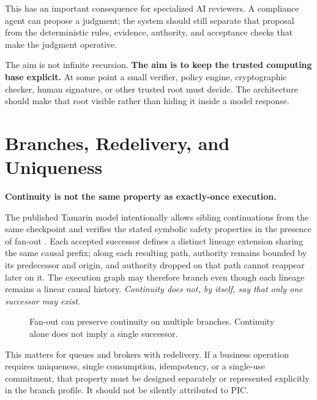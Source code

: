 \documentclass[10pt,oneside,openany]{book}
\begin{document}
This has an important consequence for specialized AI reviewers. A compliance agent can propose a judgment; the system should still separate that proposal from the deterministic rules, evidence, authority, and acceptance checks that make the judgment operative.

The aim is not infinite recursion. \textbf{The aim is to keep the trusted computing base explicit.} At some point a small verifier, policy engine, cryptographic checker, human signature, or other trusted root must decide. The architecture should make that root visible rather than hiding it inside a model response.


\chapter{Branches, Redelivery, and Uniqueness}

\textbf{Continuity is not the same property as exactly-once execution.}

The published Tamarin model intentionally allows sibling continuations from the same checkpoint and verifies the stated symbolic safety properties in the presence of fan-out \cite{pictamarin}. Each accepted successor defines a distinct lineage extension sharing the same causal prefix; along each resulting path, authority remains bounded by its predecessor and origin, and authority dropped on that path cannot reappear later on it. The execution graph may therefore branch even though each lineage remains a linear causal history. \emph{Continuity does not, by itself, say that only one successor may exist.}

\begin{figure}[ht]
\centering
{}
\caption{Fan-out can preserve continuity on multiple branches. Continuity alone does not imply a single successor.}
\end{figure}

This matters for queues and brokers with redelivery. If a business operation requires uniqueness, single consumption, idempotency, or a single-use commitment, that property must be designed separately or represented explicitly in the branch profile. It should not be silently attributed to PIC.
\end{document}
